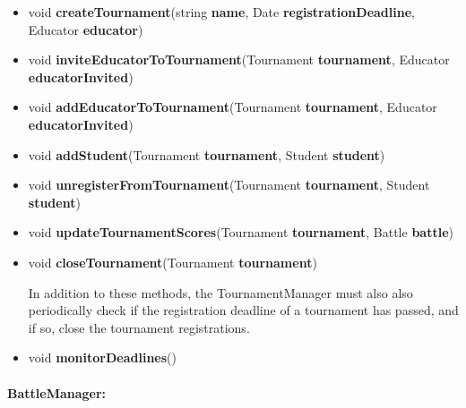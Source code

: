 \documentclass{article}
\begin{document}
\begin{itemize}
    \item void \textbf{createTournament}(string \textbf{name}, Date \textbf{registrationDeadline}, Educator \textbf{educator})
    \item void \textbf{inviteEducatorToTournament}(Tournament \textbf{tournament}, Educator \textbf{educatorInvited})
    \item void \textbf{addEducatorToTournament}(Tournament \textbf{tournament}, 
    Educator \textbf{educatorInvited})
    \item void \textbf{addStudent}(Tournament \textbf{tournament}, Student \textbf{student})
    \item void \textbf{unregisterFromTournament}(Tournament \textbf{tournament}, Student \textbf{student})
    \item void \textbf{updateTournamentScores}(Tournament \textbf{tournament}, Battle \textbf{battle})
    \item void \textbf{closeTournament}(Tournament \textbf{tournament})
    
    In addition to these methods, the TournamentManager must also also periodically check if the registration deadline of a tournament has passed, and if so, close the tournament registrations.
    \item void \textbf{monitorDeadlines}()
\end{itemize}

\paragraph{BattleManager:}
\end{document}
